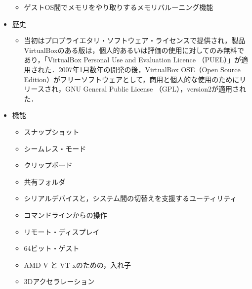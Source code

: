 \begin{itemize}
\begin{itemize}
 \item	ゲストOS間でメモリをやり取りするメモリバルーニング機能

\end{itemize}


 \item	歴史

\begin{itemize}
\setlength{\parskip}{3mm}

 \item	当初はプロプライエタリ・ソフトウェア・ライセンスで提供され，製品VirtualBoxのある版は，個人的あるいは評価の使用に対してのみ無料であり，「VirtualBox Personal Use and Evaluation Licence （PUEL）」が適用された．2007年1月数年の開発の後，VirtualBox OSE（Open Source Edition）がフリーソフトウェアとして，商用と個人的な使用のためにリリースされ，GNU General Public License （GPL），version2が適用された．

\end{itemize}

 \item	機能

\begin{itemize}
\setlength{\parskip}{3mm}


 \item	スナップショット

 \item	シームレス・モード

 \item	クリップボード

 \item	共有フォルダ

 \item	シリアルデバイスと，システム間の切替えを支援するユーティリティ

 \item	コマンドラインからの操作

 \item	リモート・ディスプレイ

 \item	64ビット・ゲスト

 \item	AMD-V と VT-xのための，入れ子

 \item	3Dアクセラレーション


\end{itemize}

\end{itemize}



